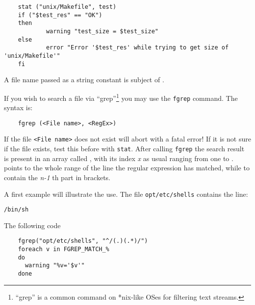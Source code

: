 \begin{example}
\begin{verbatim}
    stat ("unix/Makefile", test)
    if ("$test_res" == "OK")
    then
            warning "test_size = $test_size"
    else
            error "Error '$test_res' while trying to get size of 'unix/Makefile'"
    fi
\end{verbatim}
\end{example}

    A file name passed as a string constant is subject of
    .


    If you wish to search a file via ``grep''\footnote{``grep'' is a common
    command on *nix-like OSes for filtering text streams.}
    you may use the \texttt{fgrep} command. The syntax is:

\begin{example}
\begin{verbatim}
    fgrep (<File name>, <RegEx>)
\end{verbatim}
\end{example}

    If the file \texttt{<File name>} does not exist 
    will abort with a fatal error! If it is not sure if the file exists,
    test this before with \texttt{stat}. After calling \texttt{fgrep} the
    search result is present in an array called , with
    its index \emph{x} as usual ranging from one to .
     points to the whole range of the line the regular
    expression has matched, while  to 
    contain the \emph{n-1} th part in brackets.

    A first example will illustrate the use. The file
    \texttt{opt/etc/shells} contains the line:

\begin{example}
\begin{verbatim}
/bin/sh
\end{verbatim}
\end{example}

    The following code

\begin{example}
\begin{verbatim}
    fgrep("opt/etc/shells", "^/(.)(.*)/")
    foreach v in FGREP_MATCH_%
    do
      warning "%v='$v'"
    done
\end{verbatim}
\end{example}

